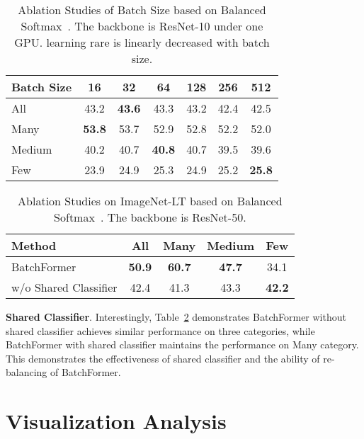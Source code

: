 \documentclass[10pt,twocolumn,letterpaper]{article}
\begin{document}
\begin{table}[tp]
\small
\caption{Ablation Studies of Batch Size based on Balanced Softmax~\cite{ren2020balanced}. The backbone is ResNet-10 under one GPU. learning rare is linearly decreased with batch size.}
\label{table:ab_batch_size}
\centering
\begin{tabular}{@{}lcccccc@{}}
\hline
Batch Size & 16 & 32 & 64 & 128 & 256 & 512  \\

\hline
All &  43.2  & {\bf 43.6} & 43.3 & 43.2 & 42.4 &42.5\\
Many & {\bf 53.8} & 53.7 & 52.9&   52.8 & 52.2 & 52.0\\
Medium & 40.2 & 40.7 & {\bf 40.8} &   40.7 &    39.5 & 39.6\\
Few & 23.9  &24.9 &  25.3 &  24.9 &  25.2 & {\bf 25.8 }\\
\hline
\end{tabular}
\end{table}

\begin{table}[tp]
\small
\caption{Ablation Studies on ImageNet-LT based on Balanced Softmax~\cite{ren2020balanced}. The backbone is ResNet-50.}
\label{table:ab_modules}
\centering

\begin{tabular}{@{}lcccc@{}}
\hline
Method & All & Many & Medium & Few \\
\hline
BatchFormer & {\bf 50.9} & {\bf 60.7} & {\bf 47.7} & 34.1 \\
w/o Shared Classifier &42.4 & 41.3  & 43.3 & {\bf 42.2} \\
\hline
\end{tabular}
\end{table}




{\bf Shared Classifier}. Interestingly, Table~\ref{table:ab_modules} demonstrates BatchFormer without shared classifier achieves similar performance on three categories, while BatchFormer with shared classifier maintains the performance on Many category. This demonstrates the effectiveness of shared classifier and the ability of re-balancing of BatchFormer.

\section{Visualization Analysis}
\label{sec:visualize}
\label{sec:grad_analysis}
\end{document}

